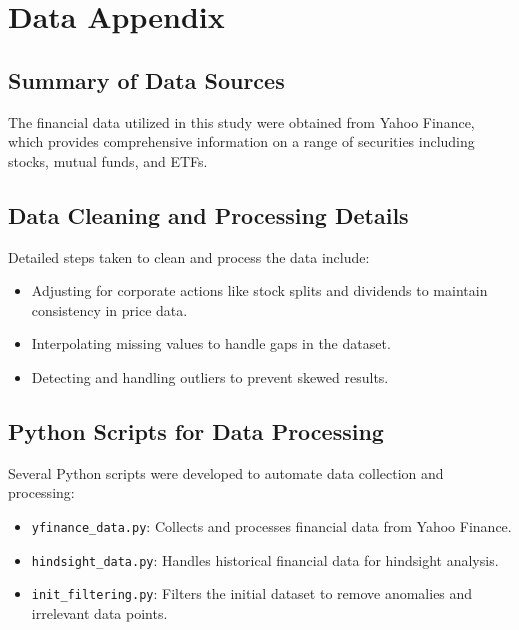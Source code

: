 \section{Data Appendix}

\subsection{Summary of Data Sources}
The financial data utilized in this study were obtained from Yahoo Finance, which provides comprehensive information on a range of securities including stocks, mutual funds, and ETFs.

\subsection{Data Cleaning and Processing Details}
Detailed steps taken to clean and process the data include:
\begin{itemize}
    \item Adjusting for corporate actions like stock splits and dividends to maintain consistency in price data.
    \item Interpolating missing values to handle gaps in the dataset.
    \item Detecting and handling outliers to prevent skewed results.
\end{itemize}

\subsection{Python Scripts for Data Processing}
Several Python scripts were developed to automate data collection and processing:
\begin{itemize}
    \item \texttt{yfinance\_data.py}: Collects and processes financial data from Yahoo Finance.
    \item \texttt{hindsight\_data.py}: Handles historical financial data for hindsight analysis.
    \item \texttt{init\_filtering.py}: Filters the initial dataset to remove anomalies and irrelevant data points.
\end{itemize}

